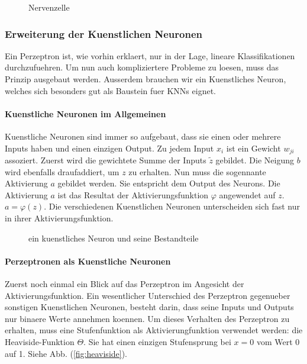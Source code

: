 \documentclass[../main]{subfiles}
\begin{document}

\begin{figure}[h!]

  \caption{Nervenzelle}
\end{figure}


\subsubsection{Erweiterung der Kuenstlichen Neuronen}\label{sec:kuenstlicheNeuronen}
Ein Perzeptron ist, wie vorhin erklaert, nur in der Lage, lineare Klassifikationen
durchzufuehren. Um nun auch kompliziertere Probleme zu loesen, muss das Prinzip
ausgebaut werden. Ausserdem brauchen wir ein Kuenstliches Neuron, welches sich
besonders gut als Baustein fuer KNNs eignet.

\paragraph{Kuenstliche Neuronen im Allgemeinen}
Kuenstliche Neuronen sind immer so aufgebaut, dass sie einen oder mehrere Inputs
haben und einen einzigen Output. Zu jedem Input $x_i$ ist ein Gewicht
$w_{ji}$ assoziert. Zuerst wird die gewichtete Summe der Inputs $\tilde{z}$ gebildet.
Die Neigung $b$ wird ebenfalls draufaddiert, um $z$ zu erhalten. Nun muss
die sogennante Aktivierung $a$ gebildet werden. Sie entspricht dem Output des Neurons.
Die Aktivierung $a$ ist das Resultat der Aktivierungsfunktion $\varphi$ angewendet
auf $z$. $a = \varphi(z)$. Die verschiedenen Kuenstlichen Neuronen unterscheiden
sich fast nur in ihrer Aktivierungsfunktion.

\begin{figure}[h!]

  \caption{ein kuenstliches Neuron und seine Bestandteile}
\end{figure}

\paragraph{Perzeptronen als Kuenstliche Neuronen}
Zuerst noch einmal ein Blick auf das Perzeptron im Angesicht der Aktivierungsfunktion.
Ein wesentlicher Unterschied des Perzeptron gegenueber sonstigen Kuenstlichen
Neuronen, besteht darin, dass seine Inputs und Outputs nur binaere Werte
annehmen koennen. Um dieses Verhalten des Perzeptron zu erhalten,
muss eine Stufenfunktion als Aktivierungfunktion verwendet werden: die Heaviside-Funktion $\Theta$.
Sie hat einen einzigen Stufensprung bei $x=0$ vom Wert 0 auf 1. Siehe Abb. (\ref{fig:heaviside}).
\end{document}
